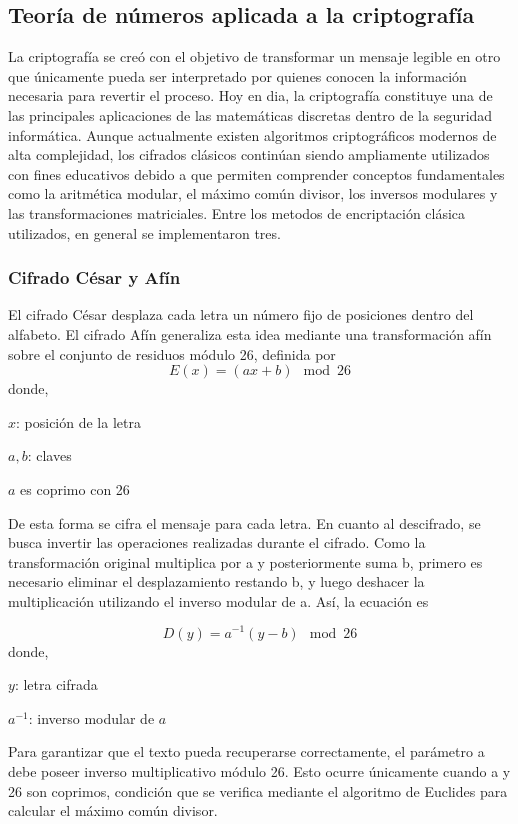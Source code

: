 \documentclass[conference]{IEEEtran}
\begin{document}
\subsection{Teoría de números aplicada a la criptografía}
La criptografía se creó con el objetivo de transformar un mensaje legible en otro que únicamente pueda ser interpretado por quienes conocen la información necesaria para revertir el proceso. \cite{Mat. DisC. Ingles Cripto Uso Historia}
Hoy en dia, la criptografía constituye una de las principales aplicaciones de las matemáticas discretas dentro de la seguridad informática.\cite{Mat. DisC. Ingles Cripto Uso hoy} Aunque actualmente existen algoritmos criptográficos modernos de alta complejidad, los cifrados clásicos continúan siendo ampliamente utilizados con fines educativos debido a que permiten comprender conceptos fundamentales como la aritmética modular, el máximo común divisor, los inversos modulares y las transformaciones matriciales. Entre los metodos de encriptación clásica utilizados, en general se implementaron tres.

\subsubsection{Cifrado César y Afín}
El cifrado César desplaza cada letra un número fijo de posiciones dentro del alfabeto\cite{Cesar desplaz}. El cifrado Afín generaliza esta idea mediante una transformación afín sobre el conjunto de residuos módulo 26, definida por
\[
E(x)=(ax+b) \mod 26
\]
donde,

$x$: posición de la letra

$a,b$: claves

$a$ es coprimo con 26

De esta forma se cifra el mensaje para cada letra. En cuanto al descifrado, se busca invertir las operaciones realizadas durante el cifrado. Como la transformación original multiplica por a y posteriormente suma b, primero es necesario eliminar el desplazamiento restando b, y luego deshacer la multiplicación utilizando el inverso modular de a. Así, la ecuación es 

\[
D(y)=a^{-1}(y-b) \mod 26
\]
donde,

$y$: letra cifrada

$a^{-1}$: inverso modular de $a$

Para garantizar que el texto pueda recuperarse correctamente, el parámetro a debe poseer inverso multiplicativo módulo 26. Esto ocurre únicamente cuando a y 26 son coprimos, condición que se verifica mediante el algoritmo de Euclides para calcular el máximo común divisor.
\end{document}
